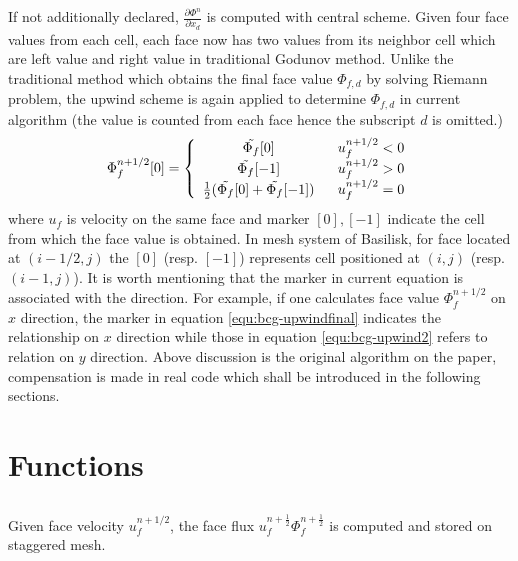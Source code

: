 If not additionally declared, $\frac{\partial \Phi^n}{\partial x_d}$ is computed with central scheme.
Given four face values from each cell, each face now has two values from its neighbor cell which are left value and right value in traditional Godunov method. Unlike the traditional method which obtains the final face value $\Phi_{f,d}$ by solving Riemann problem, the upwind scheme is again applied to determine $\Phi_{f,d}$ in current algorithm (the value is counted from each face hence the subscript $d$ is omitted.)
\begin{equation}
    \Phi^{n+1/2}_{f}[0] = \left\{
    \begin{array}{cc}
         \Tilde{\Phi_f}[0]\ \ &u^{n+1/2}_f<0\\
         \Tilde{\Phi_f}[-1]\ \ &u^{n+1/2}_f>0\\
         \frac{1}{2}(\Tilde{\Phi_f}[0]+\Tilde{\Phi_f}[-1])\ \ &u^{n+1/2}_f=0
    \end{array}
    \right.
    \label{equ:bcg-upwindfinal}
\end{equation}
where $u_f$ is velocity on the same face and marker $[0],[-1]$ indicate the cell from which the face value is obtained. In mesh system of Basilisk, for face located at $(i-1/2,j)$ the $[0]$ (resp. $[-1]$) represents cell positioned at $(i,j)$ (resp. $(i-1,j)$). It is worth mentioning that the marker in current equation is associated with the direction. For example, if one calculates face value $\Phi_f^{n+1/2}$ on $x$ direction, the marker in equation \ref{equ:bcg-upwindfinal} indicates the relationship on $x$ direction while those in equation \ref{equ:bcg-upwind2} refers to relation on $y$ direction. Above discussion is the original algorithm on the paper, compensation is made in real code which shall be introduced in the following sections.

\section{Functions}

\subsection{}
Given face velocity $u^{n+1/2}_f$, the face flux $u_{f}^{n+ \frac{1}{2}}\Phi_{f}^{n + \frac{1}{2}}$ is computed and stored on staggered mesh.
